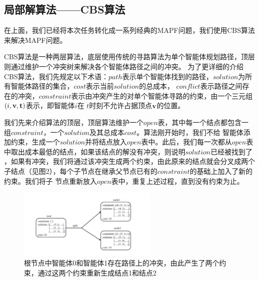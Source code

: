 \documentclass[UTF8]{ctexart}  %
\begin{document}
\subsection{局部解算法——CBS算法}
在上面，我们已经将本次任务转化成一系列经典的MAPF问题，我们使用CBS算法来解决MAPF问题。

CBS算法是一种两层算法，底层使用传统的寻路算法为单个智能体规划路径，顶层则通过维护一个冲突树来解决各个智能体路径之间的冲突。
为了更详细的介绍CBS算法，我们先规定以下术语：$path$表示单个智能体找到的路径，$solution$为所有智能体路径的集合，$cost$表示当前$solution$的总成本，
$conflict$表示路径之间存在的冲突，$constraint$表示由冲突产生的对单个智能体寻路的约束，由一个三元组$( i, \bf v, t)$表示，即智能体$i$在
$t$时刻不允许占据顶点$\bf v$的位置。

我们先来介绍算法的顶层，顶层算法维护一个$open$表，其中每一个结点都包含一组$constraint$，一个$solution$及其总成本$cost$。算法刚开始时，我们不给
智能体添加约束，生成一个$solution$并将结点放入$open$表中。此后，我们每一次都从$open$表中取出成本最低的结点，如果该结点的解没有冲突，则说明$solution$已经被找到了
，如果有冲突，我们将通过该冲突生成两个约束，由此原来的结点就会分叉成两个子结点（见图2），每个子节点在继承父节点已有的$constraint$的基础上加入了新的约束。我们将子
节点重新放入$open$表中，重复上述过程，直到没有约束为止。

\begin{figure}[H]
    \centering
    \centering
    \includegraphics[width=0.6\textwidth, keepaspectratio]{fig3.png}
    \captionsetup{font=footnotesize}
    \caption{根节点中智能体0和智能体1存在路径上的冲突，由此产生了两个约束，通过这两个约束重新生成结点1和结点2}
    \label{figure1}
\end{figure}
\end{document}
